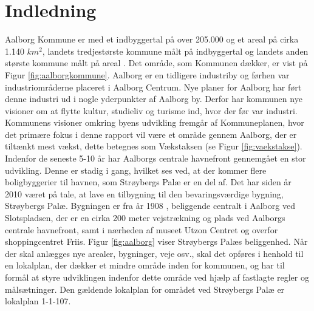 \chapter{Indledning}
Aalborg Kommune er med et indbyggertal på over 205.000 og et areal på cirka  1.140 $km^2$, landets tredjestørste kommune målt på indbyggertal og landets anden største kommune målt på areal \citep{indbyggertal}. Det område, som Kommunen dækker, er vist på Figur \ref{fig:aalborgkommune}. 
\newline \indent{     }  Aalborg er en tidligere industriby og førhen var industriområderne placeret i Aalborg Centrum. Nye planer for Aalborg har ført denne industri ud i nogle yderpunkter af Aalborg by. Derfor har kommunen nye visioner om at flytte kultur, studieliv og turisme ind, hvor der før var industri. Kommunens visioner omkring byens udvikling fremgår af Kommuneplanen, hvor det primære fokus i denne rapport vil være et område gennem Aalborg, der er tiltænkt mest vækst, dette betegnes som Vækstaksen (se Figur \ref{fig:vaekstakse}).
\newline \indent{     }  Indenfor de seneste 5-10 år har Aalborgs centrale havnefront gennemgået en stor udvikling. Denne er stadig i gang, hvilket ses ved, at der kommer flere boligbyggerier til havnen, som Strøybergs Palæ er en del af. 
\newline \indent{     }  Det har siden år 2010 været på tale, at lave en tilbygning til den bevaringsværdige bygning, Strøybergs Palæ. Bygningen er fra år 1908 \citep{byggesagen}, beliggende centralt i Aalborg ved Slotspladsen, der er en cirka 200 meter vejstrækning og plads ved Aalborgs centrale havnefront, samt i nærheden af museet Utzon Centret og overfor shoppingcentret Friis. Figur \ref{fig:aalborg} viser Strøybergs Palæs beliggenhed. 
\newline \indent{     }  Når der skal anlægges nye arealer, bygninger, veje osv., skal det opføres i henhold til en lokalplan, der dækker et mindre område inden for kommunen, og har til formål at styre udviklingen indenfor dette område ved hjælp af fastlagte regler og målsætninger. Den gældende lokalplan for området ved Strøybergs Palæ er lokalplan 1-1-107. 

